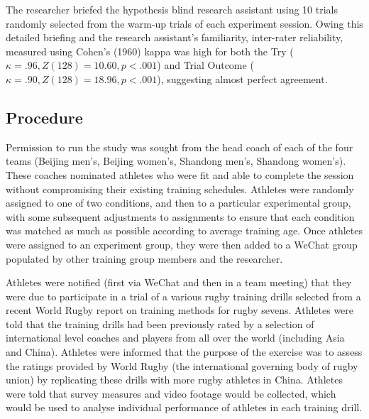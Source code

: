 The researcher briefed the hypothesis blind research assistant using 10 trials randomly selected from the warm-up trials of each experiment session. Owing this detailed briefing and the research assistant's familiarity, inter-rater reliability, measured using Cohen's (1960) kappa \citep[suitable for two coders, see][]{DiEugenio2004} was high for both the Try ($\kappa = .96, Z(128) = 10.60, p < .001$) and Trial Outcome ($\kappa = .90, Z(128) = 18.96, p < .001$), suggesting almost perfect agreement.

\subsection{Procedure}
Permission to run the study was sought from the head coach of each of the four teams (Beijing men's, Beijing women's, Shandong men's, Shandong women's).  These coaches nominated athletes who were fit and able to complete the session without compromising their existing training schedules.  Athletes were randomly assigned to one of two conditions, and then to a particular experimental group, with some subsequent adjustments to assignments to ensure that each condition was matched as much as possible according to average training age.  Once athletes were assigned to an experiment group, they were then added to a WeChat group populated by other training group members and the researcher.

Athletes were notified (first via WeChat and then in a team meeting) that they were due to participate in a trial of a various rugby training drills selected from a recent World Rugby report on training methods for rugby sevens.  Athletes were told that the training drills had been previously rated by a selection of international level coaches and players from all over the world (including Asia and China).  Athletes were informed that the purpose of the exercise was to assess the ratings provided by World Rugby (the international governing body of rugby union) by replicating these drills with more rugby athletes in China.  Athletes were told that survey measures and video footage would be collected, which would be used to analyse individual performance of athletes in each training drill.



